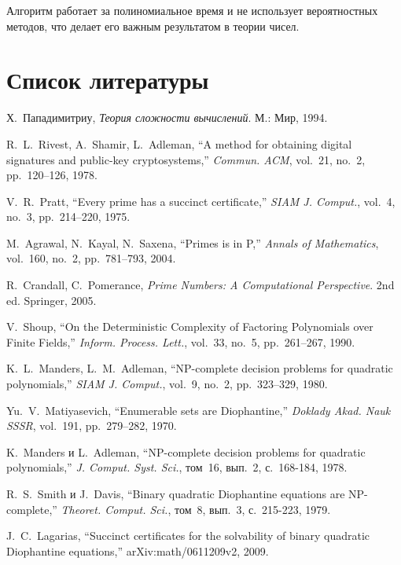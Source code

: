 \documentclass[a4paper,12pt]{article}
\begin{document}
Алгоритм работает за полиномиальное время и не использует вероятностных методов, что делает его важным результатом в теории чисел.

\newpage
\section{Список литературы}
\renewcommand{\refname}{}


\begin{thebibliography}{}

Х.~Пападимитриу, \emph{Теория сложности вычислений}. М.: Мир, 1994.

R.~L.~Rivest, A.~Shamir, L.~Adleman, ``A method for obtaining digital signatures and public-key cryptosystems,'' \emph{Commun. ACM}, vol.~21, no.~2, pp.~120--126, 1978.

V.~R.~Pratt, ``Every prime has a succinct certificate,'' \emph{SIAM J. Comput.}, vol.~4, no.~3, pp.~214--220, 1975.

M.~Agrawal, N.~Kayal, N.~Saxena, ``Primes is in P,'' \emph{Annals of Mathematics}, vol.~160, no.~2, pp.~781--793, 2004.

R.~Crandall, C.~Pomerance, \emph{Prime Numbers: A Computational Perspective}. 2nd ed. Springer, 2005.

V.~Shoup, ``On the Deterministic Complexity of Factoring Polynomials over Finite Fields,'' \emph{Inform. Process. Lett.}, vol.~33, no.~5, pp.~261--267, 1990.

K.~L.~Manders, L.~M.~Adleman, ``NP-complete decision problems for quadratic polynomials,'' \emph{SIAM J. Comput.}, vol.~9, no.~2, pp.~323--329, 1980.

Yu.~V.~Matiyasevich, ``Enumerable sets are Diophantine,'' \emph{Doklady Akad. Nauk SSSR}, vol.~191, pp.~279--282, 1970.


K.~Manders и L.~Adleman, ``NP-complete decision problems for quadratic polynomials,'' \emph{J. Comput. Syst. Sci.}, том~16, вып.~2, с.~168-184, 1978.

R.~S.~Smith и J.~Davis, ``Binary quadratic Diophantine equations are NP-complete,'' \emph{Theoret. Comput. Sci.}, том~8, вып.~3, с.~215-223, 1979.

J.~C.~Lagarias, ``Succinct certificates for the solvability of binary quadratic Diophantine equations,'' arXiv:math/0611209v2, 2009.


\end{thebibliography}
\end{document}
